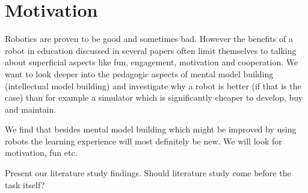 \section{Motivation}
Robotics are proven to be good and sometimes bad. However the benefits of a robot in education discussed in several papers often limit themselves to talking about superficial aspects like fun, engagement, motivation and cooperation. We want to look deeper into the pedagogic aspects of mental model building (intellectual model building) and investigate why a robot is better (if that is the case) than for example a simulator which is significantly cheaper to develop, buy and maintain. 

\bigskip\noindent
We find that besides mental model building which might be improved by using robots the learning experience will most definitely be new. We will look for motivation, fun etc. 

\bigskip\noindent
Present our literature study findings. Should literature study come before the task itself?
